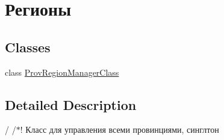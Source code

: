 \hypertarget{group___provs_regions}{}\section{Регионы}
\label{group___provs_regions}
\subsection*{Classes}
\begin{DoxyCompactItemize}
\item 
class \hyperlink{class_prov_region_manager_class}{Prov\+Region\+Manager\+Class}
\end{DoxyCompactItemize}


\subsection{Detailed Description}
/ /$\ast$! Класс для управления всеми провинциями, синглтон 